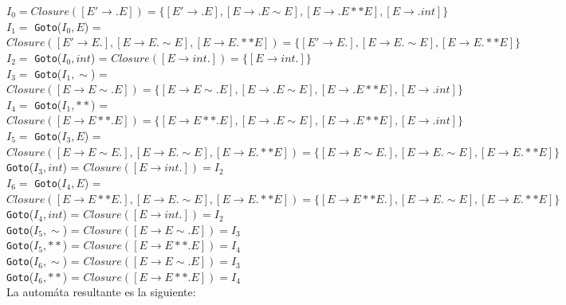 \documentclass[12pt, letterpaper]{article}
\begin{document}
\begin{enumerate}
$I_0 = Closure([E' \rightarrow .E]) = \{ [E' \rightarrow .E], [E \rightarrow .E \sim E], [E \rightarrow .E ** E], [E \rightarrow .int] \} $\\
$I_1 =$ \texttt{Goto}($I_0, E$) = $Closure([E' \rightarrow E.], [E \rightarrow E. \sim E], [E \rightarrow E. ** E]) = \{ [E' \rightarrow E.], [E \rightarrow E. \sim E], [E \rightarrow E. ** E] \} $\\
$I_2 =$ \texttt{Goto}($I_0, int$) = $Closure([E \rightarrow int.]) = \{ [E \rightarrow int.] \} $\\
$I_3 =$ \texttt{Goto}($I_1, \sim$) = $Closure([E \rightarrow E \sim . E]) = \{ [E \rightarrow E \sim . E], [E \rightarrow .E \sim E], [E \rightarrow .E ** E], [E \rightarrow .int] \} $\\
$I_4 =$ \texttt{Goto}($I_1, **$) = $Closure([E \rightarrow E ** . E]) = \{ [E \rightarrow E ** . E], [E \rightarrow .E \sim E], [E \rightarrow .E ** E], [E \rightarrow .int] \} $\\
$I_5 =$ \texttt{Goto}($I_3, E$) = $Closure([E \rightarrow E \sim E.], [E \rightarrow E. \sim E], [E \rightarrow E. ** E]) = \{ [E \rightarrow E \sim E.], [E \rightarrow E. \sim E], [E \rightarrow E. ** E] \} $\\
\texttt{Goto}($I_3, int$) = $Closure([E \rightarrow int.]) = I_2$\\
$I_6 =$ \texttt{Goto}($I_4, E$) = $Closure([E \rightarrow E ** E.], [E \rightarrow E. \sim E], [E \rightarrow E. ** E]) = \{ [E \rightarrow E ** E.], [E \rightarrow E. \sim E], [E \rightarrow E. ** E] \} $\\
\texttt{Goto}($I_4, int$) = $Closure([E \rightarrow int.]) = I_2$\\
\texttt{Goto}($I_5, \sim$) = $Closure([E \rightarrow E \sim .E]) = I_3$\\
\texttt{Goto}($I_5, **$) = $Closure([E \rightarrow E ** .E]) = I_4$\\
\texttt{Goto}($I_6, \sim$) = $Closure([E \rightarrow E \sim .E]) = I_3$\\
\texttt{Goto}($I_6, **$) = $Closure([E \rightarrow E ** .E]) = I_4$\\
La automáta resultante es la siguiente:
\begin{center}
\end{center}
\end{enumerate}
\end{document}
